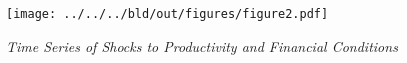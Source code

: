 \begin{figure}[h]
  \centering
  \texttt{[image: ../../../bld/out/figures/figure2.pdf]}
  \caption{\textit{Time Series of Shocks to Productivity and Financial Conditions}}
  \label{fig:figure2_update}
\end{figure}